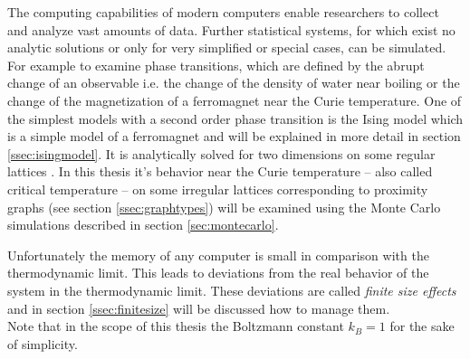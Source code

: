 The computing capabilities of modern computers enable researchers to
collect and analyze vast amounts of data.
Further statistical systems, for which exist no analytic solutions
or only for very simplified or special cases, can be simulated.
For example to examine phase transitions, which are defined by the abrupt
change of an observable i.e. the change of the density of water near
boiling or the change of the magnetization of a ferromagnet near the
Curie temperature. One of the simplest models with a second order
phase transition is the Ising model \cite{Ising1925} which is a simple
model of a ferromagnet and will be explained in more detail in section
\ref{ssec:isingmodel}. It is analytically solved for two dimensions on
some regular lattices \cite{Onsager1944} \cite{Wannier1945}.
In this thesis it's behavior near the Curie temperature -- also called
critical temperature -- on some irregular lattices corresponding to
proximity graphs (see section \ref{ssec:graphtypes}) will be examined
using the Monte Carlo simulations described in section \ref{sec:montecarlo}.

Unfortunately the memory of any computer is small in comparison with the
thermodynamic limit. This leads to deviations from the real behavior of
the system in the thermodynamic limit. These deviations are called
\emph{finite size effects} and in section \ref{ssec:finitesize} will be
discussed how to manage them.\\

Note that in the scope of this thesis the Boltzmann constant \(k_{B}=1\)
for the sake of simplicity.
